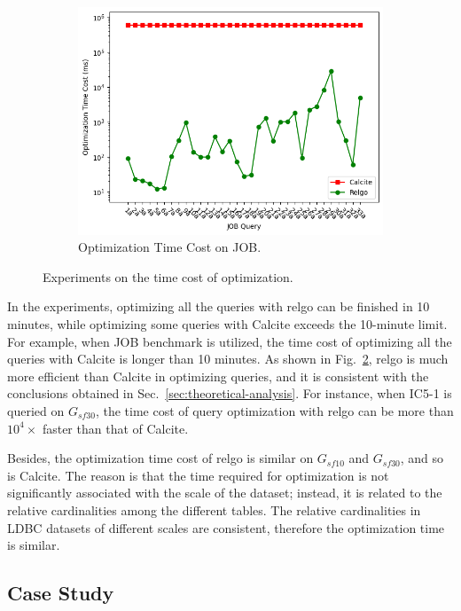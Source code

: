 \begin{figure}
    \begin{subfigure}[b]{0.3\linewidth}
        \centering
        \includegraphics[width=\linewidth]{./figures/exp/optimization_job.png}
        \caption{Optimization Time Cost on JOB.}
        \label{fig:exp-optimization-job}
    \end{subfigure}
    \caption{Experiments on the time cost of optimization.}
    \label{fig:exp-optimization}
\end{figure}

In the experiments, optimizing all the queries with relgo can be finished in 10 minutes, while optimizing some queries with Calcite exceeds the 10-minute limit.
For example, when JOB benchmark is utilized, the time cost of optimizing all the queries with Calcite is longer than 10 minutes.
As shown in Fig.~\ref{fig:exp-optimization}, relgo is much more efficient than Calcite in optimizing queries, and it is consistent with the conclusions obtained in Sec.~\ref{sec:theoretical-analysis}.
For instance, when IC5-1 is queried on $G_{sf30}$, the time cost of query optimization with relgo can be more than $10^4\times$ faster than that of Calcite.

Besides, the optimization time cost of relgo is similar on $G_{sf10}$ and $G_{sf30}$, and so is Calcite.
The reason is that the time required for optimization is not significantly associated with the scale of the dataset; instead, it is related to the relative cardinalities among the different tables.
The relative cardinalities in LDBC datasets of different scales are consistent, therefore the optimization time is similar.

\subsection{Case Study}
\label{sec:experiment-case-study}